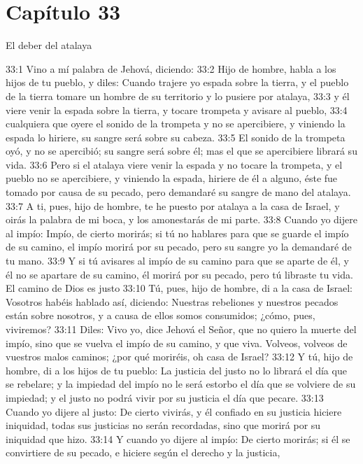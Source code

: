 \section*{Capítulo 33  }
El deber del atalaya    
  
33:1 Vino a mí palabra de Jehová, diciendo:   
33:2 Hijo de hombre, habla a los hijos de tu pueblo, y diles: Cuando trajere yo espada sobre la tierra, y el pueblo de la tierra tomare un hombre de su territorio y lo pusiere por atalaya,   
33:3 y él viere venir la espada sobre la tierra, y tocare trompeta y avisare al pueblo,   
33:4 cualquiera que oyere el sonido de la trompeta y no se apercibiere, y viniendo la espada lo hiriere, su sangre será sobre su cabeza.   
33:5 El sonido de la trompeta oyó, y no se apercibió; su sangre será sobre él; mas el que se apercibiere librará su vida.   
33:6 Pero si el atalaya viere venir la espada y no tocare la trompeta, y el pueblo no se apercibiere, y viniendo la espada, hiriere de él a alguno, éste fue tomado por causa de su pecado, pero demandaré su sangre de mano del atalaya.   
33:7 A ti, pues, hijo de hombre, te he puesto por atalaya a la casa de Israel, y oirás la palabra de mi boca, y los amonestarás de mi parte.   
33:8 Cuando yo dijere al impío: Impío, de cierto morirás; si tú no hablares para que se guarde el impío de su camino, el impío morirá por su pecado, pero su sangre yo la demandaré de tu mano.   
33:9 Y si tú avisares al impío de su camino para que se aparte de él, y él no se apartare de su camino, él morirá por su pecado, pero tú libraste tu vida.   
El camino de Dios es justo   
33:10 Tú, pues, hijo de hombre, di a la casa de Israel: Vosotros habéis hablado así, diciendo: Nuestras rebeliones y nuestros pecados están sobre nosotros, y a causa de ellos somos consumidos; ¿cómo, pues, viviremos?   
33:11 Diles: Vivo yo, dice Jehová el Señor, que no quiero la muerte del impío, sino que se vuelva el impío de su camino, y que viva. Volveos, volveos de vuestros malos caminos; ¿por qué moriréis, oh casa de Israel?   
33:12 Y tú, hijo de hombre, di a los hijos de tu pueblo: La justicia del justo no lo librará el día que se rebelare; y la impiedad del impío no le será estorbo el día que se volviere de su impiedad; y el justo no podrá vivir por su justicia el día que pecare.   
33:13 Cuando yo dijere al justo: De cierto vivirás, y él confiado en su justicia hiciere iniquidad, todas sus justicias no serán recordadas, sino que morirá por su iniquidad que hizo.   
33:14 Y cuando yo dijere al impío: De cierto morirás; si él se convirtiere de su pecado, e hiciere según el derecho y la justicia,   
